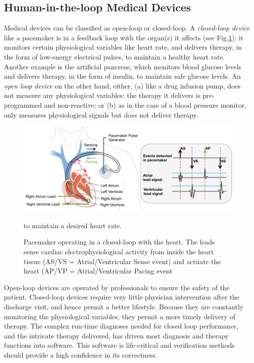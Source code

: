 \subsection{Human-in-the-loop Medical Devices}
Medical devices can be classified as open-loop or closed-loop.
A \emph{closed-loop device} like a pacemaker is in a feedback loop with the organ(s) it affects (see Fig.\ref{fig:pacemaker}): it monitors certain physiological variables like heart rate, and delivers therapy, in the form of low-energy electrical pulses, to maintain a healthy heart rate.
Another example is the artificial pancreas, which monitors blood glucose levels and delivers therapy, in the form of insulin, to maintain safe glucose levels.
An \emph{open loop device} on the other hand, either, (a) like a drug infusion pump, does not measure any physiological variables: the therapy it delivers is pre-programmed and non-reactive; or (b) as in the case of a blood pressure monitor, only measures physiological signals but does not deliver therapy. 
\begin{figure}[t]
	\centering
	\includegraphics[width=\textwidth]{figs/fig1pacemaker.pdf}
	\caption{\small Pacemaker operating in a closed-loop with the heart. The leads sense cardiac electrophysiological activity from inside the heart tissue (AS/VS = Atrial/Ventricular Sense event) and actuate the heart (AP/VP = Atrial/Ventricular Pacing event} to maintain a desired heart rate.
	\label{fig:pacemaker}
\end{figure}

Open-loop devices are operated by professionals to ensure the safety of the patient.
Closed-loop devices require very little physician intervention after the discharge visit, and hence permit a better lifestyle.
Because they are constantly monitoring the physiological variables, they permit a more timely delivery of therapy. 
The complex run-time diagnoses needed for closed loop performance, and the intricate therapy delivered, has driven most diagnosis and therapy functions into software.
This software is life-critical and verification methods should provide a high confidence in its correctness.

